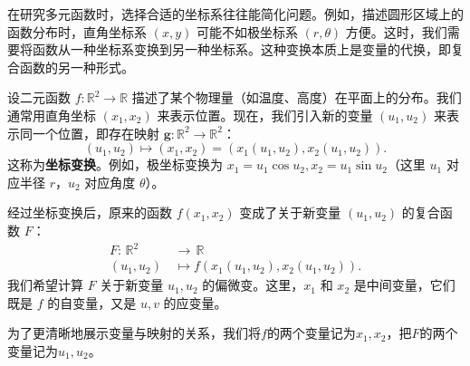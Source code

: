 \documentclass[12pt,UTF8]{ctexbook}
\begin{document}
在研究多元函数时，选择合适的坐标系往往能简化问题。例如，描述圆形区域上的函数分布时，直角坐标系 $(x, y)$ 可能不如极坐标系 $(r, \theta)$ 方便。这时，我们需要将函数从一种坐标系变换到另一种坐标系。这种变换本质上是变量的代换，即复合函数的另一种形式。

设二元函数 $f: \mathbb{R}^2 \to \mathbb{R}$ 描述了某个物理量（如温度、高度）在平面上的分布。我们通常用直角坐标 $(x_1, x_2)$ 来表示位置。现在，我们引入新的变量 $(u_1, u_2)$ 来表示同一个位置，即存在映射 $\mathbf{g}: \mathbb{R}^2 \to \mathbb{R}^2$：
$$ (u_1, u_2) \mapsto (x_1, x_2) = (x_1(u_1, u_2), x_2(u_1, u_2)). $$
这称为\textbf{坐标变换}。例如，极坐标变换为 $x_1 = u_1 \cos{u_2}, x_2 = u_1 \sin{u_2}$（这里 $u_1$ 对应半径 $r$，$u_2$ 对应角度 $\theta$）。

经过坐标变换后，原来的函数 $f(x_1, x_2)$ 变成了关于新变量 $(u_1, u_2)$ 的复合函数 $F$：
\begin{align*}
    F: \,\mathbb{R}^2 &\to\, \mathbb{R}\\
    (u_1, u_2) \, &\mapsto f(x_1(u_1, u_2), x_2(u_1, u_2)).
\end{align*}
我们希望计算 $F$ 关于新变量 $u_1, u_2$ 的偏微变。这里，$x_1$ 和 $x_2$ 是中间变量，它们既是 $f$ 的自变量，又是 $u, v$ 的应变量。

为了更清晰地展示变量与映射的关系，我们将$f$的两个变量记为$x_1,x_2$，把$F$的两个变量记为$u_1,u_2$。

\end{document}
